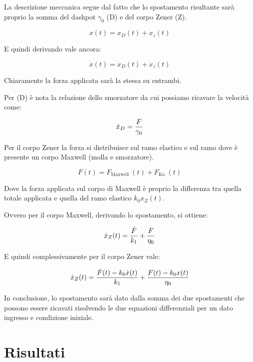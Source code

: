 La descrizione meccanica segue dal fatto che lo spostamento risultante sarà proprio la somma del dashpot $\gamma_0$ (D) e del corpo Zener (Z).

\begin{equation}
	{x}(t)={x}_{D}(t)+{x}_{z}(t)
\end{equation}

E quindi derivando vale ancora:

\begin{equation}
	\dot{x}(t)=\dot{x}_{D}(t)+\dot{x}_{z}(t)
\end{equation}

Chiaramente la forza applicata sarà la stessa su entrambi.

Per (D) è nota la relazione dello smorzatore da cui possiamo ricavare la velocità come:

\begin{equation}
	\dot{x}_D={F\over \gamma_0}
\end{equation}


Per il corpo Zener la forza si distribuisce sul ramo elastico e sul ramo dove è presente un corpo Maxwell (molla e smorzatore). 

\begin{equation}
	F(t)=F_{\text {Maxwell }}(t)+F_{\text {Ko }}(t)
\end{equation}
 
Dove la forza applicata sul corpo di Maxwell è proprio la differenza tra quella totale applicata e quella del ramo elastico $k_0 x_Z(t)$.

Ovvero per il corpo Maxwell, derivando lo spostamento, si ottiene: 

\begin{equation}
	\dot{x}_Z(t)={\dot F\over k_1}+{F\over \eta_0}
\end{equation} 

E quindi complessivamente per il corpo Zener vale:

\begin{equation}
	\dot{x}_Z(t)={\dot F(t)-k_0\dot x(t) \over k_1}+{F(t)-k_0 x(t)\over \eta_0}
	\label{eq:zener}
\end{equation} 


In conclusione, lo spostamento sarà dato dalla somma dei due spostamenti che possono essere ricavati risolvendo le due equazioni differenziali per un dato ingresso e condizione iniziale.

\section{Risultati}

